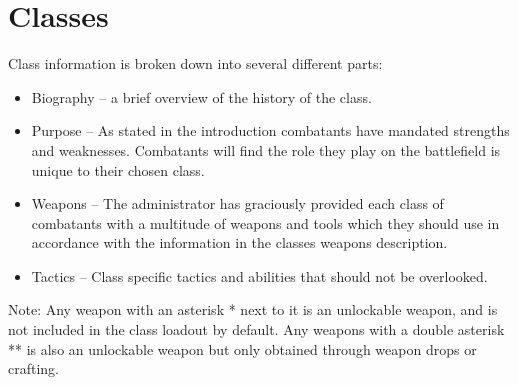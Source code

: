 \section{Classes}

Class information is broken down into several different parts:
\begin{itemize}
	\item Biography – a brief overview of the history of the class.
	\item Purpose – As stated in the introduction combatants have mandated strengths and weaknesses.  Combatants will find the role they play on the battlefield is unique to  their chosen class. 
	\item Weapons – The administrator has graciously provided each class of combatants with a multitude of weapons and tools which they should use in accordance with the information in the classes weapons description. 
	\item Tactics – Class specific tactics and abilities that should not be overlooked.
\end{itemize}
Note: Any weapon with an asterisk * next to it is an unlockable weapon, and is not included in the class loadout by default. Any weapons with a double asterisk ** is also an unlockable weapon but only obtained through weapon drops or crafting.

\newpage


\newpage


\newpage


\newpage


\newpage



\newpage


\newpage


\newpage


\newpage


